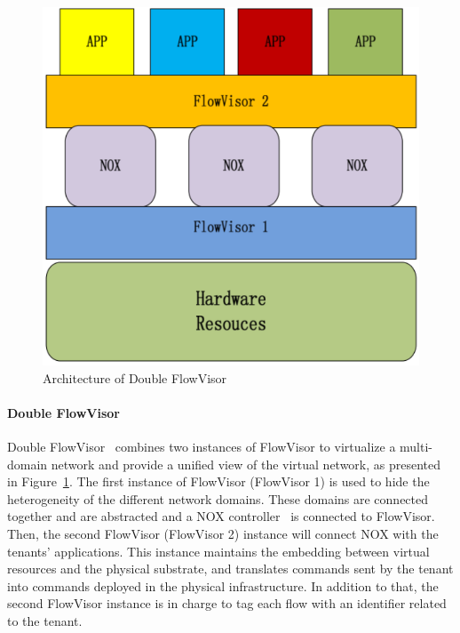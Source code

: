 \begin{figure}[h]
    \centering
    \includegraphics[scale=0.6]{figures/double_fv.pdf}
    \caption{Architecture of Double FlowVisor}
    \label{fig:double-fv}
\end{figure}

\paragraph{Double FlowVisor}
Double FlowVisor~\cite{DoubleFV-Yin2013} combines two instances of FlowVisor to virtualize a multi-domain network and provide a unified view of the virtual network, as presented in Figure~\ref{fig:double-fv}. The first instance of FlowVisor (FlowVisor 1) is used to hide the heterogeneity of the different network domains. These domains are connected together and are abstracted and a NOX controller~\cite{nox-gude2008} is connected to FlowVisor.
Then, the second FlowVisor  (FlowVisor 2) instance will connect NOX with the tenants' applications. This instance maintains the embedding between virtual resources and the physical substrate, and translates commands sent by the tenant into commands deployed in the physical infrastructure. In addition to that, the second FlowVisor instance is in charge to tag each flow with an identifier related to the tenant.

